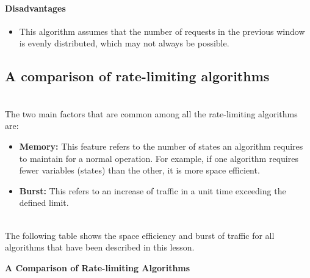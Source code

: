 \paragraph{Disadvantages}\label{Ti8Snk-2R1kbiu4ZOOm0i}

\begin{itemize}
\item
\protect{}\label{gegOJCIgGywy_BhRdNVBe}
This algorithm assumes that the number of requests in the previous window is evenly distributed, which may not always be possible.
\end{itemize}

\subsection{A comparison of rate-limiting algorithms}\label{Dg1pAYq16-L0ZxSS9suXu}
\\
The two main factors that are common among all the rate-limiting algorithms are:

\begin{itemize}
\item
\protect{}\label{bamUF__L5YYqAoEzcdaDf}
\textbf{Memory:} This feature refers to the number of states an algorithm requires to maintain for a normal operation. For example, if one algorithm requires fewer variables (states) than the other, it is more space efficient.
\item
\protect{}\label{6BbiCU0Q6YX3zQJR0lhKV}
\textbf{Burst:} This refers to an increase of traffic in a unit time exceeding the defined limit.
\end{itemize}
\\
The following table shows the space efficiency and burst of traffic for all algorithms that have been described in this lesson.

\textbf{A Comparison of Rate-limiting Algorithms}

\begin{table}[htbp]
\centering
\small
{}
\caption{A Comparison of Rate-limiting Algorithms}
\end{table}

